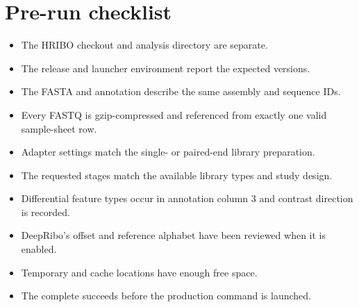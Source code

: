 \documentclass[11pt,a4paper]{article}
\newcommand{\setting}[1]{\texttt{\detokenize{#1}}}
\begin{document}
\appendix
\section{Pre-run checklist}

\small
\begin{itemize}[itemsep=0pt,parsep=0pt,topsep=0.2em]
  \item The HRIBO checkout and analysis directory are separate.
  \item The release and launcher environment report the expected versions.
  \item The FASTA and annotation describe the same assembly and sequence IDs.
  \item Every FASTQ is gzip-compressed and referenced from exactly one valid
        sample-sheet row.
  \item Adapter settings match the single- or paired-end library preparation.
  \item The requested stages match the available library types and study
        design.
  \item Differential feature types occur in annotation column 3 and contrast
        direction is recorded.
  \item DeepRibo's offset and reference alphabet have been reviewed when it is
        enabled.
  \item Temporary and cache locations have enough free space.
  \item The complete \setting{--dry-run all} succeeds before the production
        command is launched.
\end{itemize}
\normalsize
\end{document}
